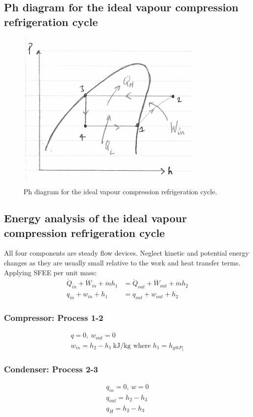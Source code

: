 \documentclass[class=report, crop=false, 12pt,a4paper]{standalone}
\begin{document}
\subsection{Ph diagram for the ideal vapour compression refrigeration cycle}
\begin{figure}
  \centering
  \includegraphics[width = 0.7 \textwidth]{../img/PhDiagram2}
  \caption{Ph diagram for the ideal vapour compression refrigeration cycle.}
\end{figure}
\subsection{Energy analysis of the ideal vapour compression refrigeration cycle}
All four components are steady flow devices. Neglect kinetic and potential energy changes as they are usually small relative to the work and heat transfer terms. Applying SFEE per unit mass:
\begin{align}
  \dot{Q}_{in} + \dot{W}_{in} + \dot{m} h_1 &= \dot{Q}_{out} + \dot{W}_{out} + \dot{m} h_2\\
  q_{in} + w_{in} + h_1 &= q_{out} + w_{out} + h_2
\end{align}
\subsubsection{Compressor: Process 1-2}
\begin{gather}
  q = 0, \ w_{out} = 0\\
  w_{in} = h_2 - h_1 \ \si{\kilo\joule\per\kg} \textrm{ where } h_1 = h_{g@P_1}
\end{gather}
\subsubsection{Condenser: Process 2-3}
\begin{gather}
  q_{in} = 0, \ w = 0 \\
  q_{out} = h_2 - h_3\\
  q_H = h_2 - h_3
\end{gather}
\end{document}
